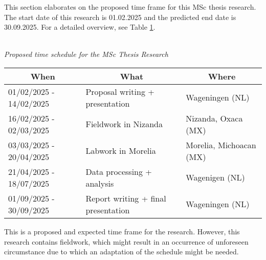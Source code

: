 

This section elaborates on the proposed time frame for this MSc thesis research. The start date of this research is 01.02.2025 and the predicted end date is 30.09.2025. For a detailed overview, see Table \ref{tab:timeschedule}.

\begin{table}[h]
\\{\textit{Proposed time schedule for the MSc Thesis Research}}\\

\begin{tabular}{lll}\hline
\multicolumn{1}{c}{\textbf{When}} & \multicolumn{1}{c}{\textbf{What}}   & \multicolumn{1}{c}{\textbf{Where}} \\\hline
01/02/2025 - 14/02/2025           & Proposal writing + presentation     & Wageningen (NL)                    \\
16/02/2025 - 02/03/2025           & Fieldwork in Nizanda                & Nizanda, Oxaca (MX)                \\
03/03/2025 - 20/04/2025           & Labwork in Morelia                  & Morelia, Michoacan (MX)            \\
21/04/2025 - 18/07/2025           & Data processing + analysis          & Wagenigen (NL)                     \\

01/09/2025 - 30/09/2025           & Report writing + final presentation & Wageningen (NL)\\\hline                 
\end{tabular}\label{tab:timeschedule}
\end{table}

This is a proposed and expected time frame for the research. However, this research contains fieldwork, which might result in an occurrence of unforeseen circumstance due to which an adaptation of the schedule might be needed. 